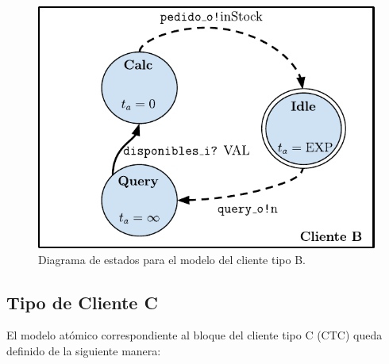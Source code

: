 \documentclass[10pt]{article}
\begin{document}
\begin{figure}[h]
	\centering
	\includegraphics{img/clienteBdevsgraph}
	\caption{Diagrama de estados para el modelo del cliente tipo B.}
	\label{fig:CTB-estados}
\end{figure}
\FloatBarrier

\subsection{Tipo de Cliente C\label{sec:CTC}}

El modelo atómico correspondiente al bloque del cliente tipo C (CTC) queda definido de la siguiente manera:
\end{document}
